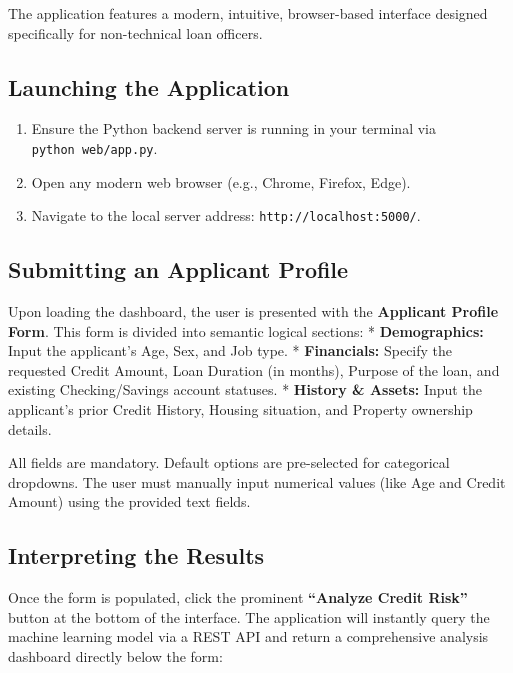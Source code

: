 The application features a modern, intuitive, browser-based interface
designed specifically for non-technical loan officers.

\hypertarget{launching-the-application}{%
\subsection{Launching the Application}\label{launching-the-application}}

\begin{enumerate}
\def\labelenumi{\arabic{enumi}.}
\tightlist
\item
  Ensure the Python backend server is running in your terminal via
  \texttt{python\ web/app.py}.
\item
  Open any modern web browser (e.g., Chrome, Firefox, Edge).
\item
  Navigate to the local server address: \texttt{http://localhost:5000/}.
\end{enumerate}

\hypertarget{submitting-an-applicant-profile}{%
\subsection{Submitting an Applicant
Profile}\label{submitting-an-applicant-profile}}

Upon loading the dashboard, the user is presented with the
\textbf{Applicant Profile Form}. This form is divided into semantic
logical sections: * \textbf{Demographics:} Input the applicant's Age,
Sex, and Job type. * \textbf{Financials:} Specify the requested Credit
Amount, Loan Duration (in months), Purpose of the loan, and existing
Checking/Savings account statuses. * \textbf{History \& Assets:} Input
the applicant's prior Credit History, Housing situation, and Property
ownership details.

All fields are mandatory. Default options are pre-selected for
categorical dropdowns. The user must manually input numerical values
(like Age and Credit Amount) using the provided text fields.

\hypertarget{interpreting-the-results}{%
\subsection{Interpreting the Results}\label{interpreting-the-results}}

Once the form is populated, click the prominent \textbf{``Analyze Credit
Risk''} button at the bottom of the interface. The application will
instantly query the machine learning model via a REST API and return a
comprehensive analysis dashboard directly below the form:

